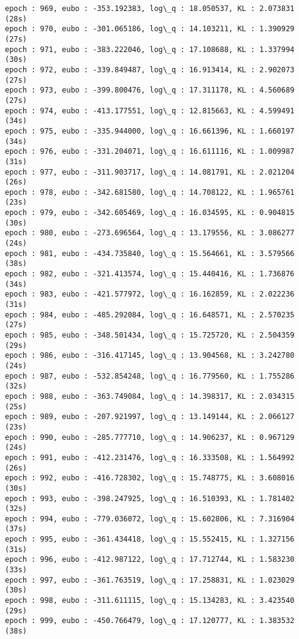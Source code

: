 \documentclass[11pt]{article}
\begin{document}
\begin{Verbatim}[commandchars=\\\{\}]
epoch : 969, eubo : -353.192383, log\_q : 18.050537, KL : 2.073831 (28s)
epoch : 970, eubo : -301.065186, log\_q : 14.103211, KL : 1.390929 (27s)
epoch : 971, eubo : -383.222046, log\_q : 17.108688, KL : 1.337994 (30s)
epoch : 972, eubo : -339.849487, log\_q : 16.913414, KL : 2.902073 (27s)
epoch : 973, eubo : -399.800476, log\_q : 17.311178, KL : 4.560689 (27s)
epoch : 974, eubo : -413.177551, log\_q : 12.815663, KL : 4.599491 (34s)
epoch : 975, eubo : -335.944000, log\_q : 16.661396, KL : 1.660197 (34s)
epoch : 976, eubo : -331.204071, log\_q : 16.611116, KL : 1.009987 (31s)
epoch : 977, eubo : -311.903717, log\_q : 14.081791, KL : 2.021204 (26s)
epoch : 978, eubo : -342.681580, log\_q : 14.708122, KL : 1.965761 (23s)
epoch : 979, eubo : -342.605469, log\_q : 16.034595, KL : 0.904815 (30s)
epoch : 980, eubo : -273.696564, log\_q : 13.179556, KL : 3.086277 (24s)
epoch : 981, eubo : -434.735840, log\_q : 15.564661, KL : 3.579566 (38s)
epoch : 982, eubo : -321.413574, log\_q : 15.440416, KL : 1.736876 (34s)
epoch : 983, eubo : -421.577972, log\_q : 16.162859, KL : 2.022236 (31s)
epoch : 984, eubo : -485.292084, log\_q : 16.648571, KL : 2.570235 (27s)
epoch : 985, eubo : -348.501434, log\_q : 15.725720, KL : 2.504359 (29s)
epoch : 986, eubo : -316.417145, log\_q : 13.904568, KL : 3.242780 (24s)
epoch : 987, eubo : -532.854248, log\_q : 16.779560, KL : 1.755286 (32s)
epoch : 988, eubo : -363.749084, log\_q : 14.398317, KL : 2.034315 (25s)
epoch : 989, eubo : -207.921997, log\_q : 13.149144, KL : 2.066127 (23s)
epoch : 990, eubo : -285.777710, log\_q : 14.906237, KL : 0.967129 (24s)
epoch : 991, eubo : -412.231476, log\_q : 16.333508, KL : 1.564992 (26s)
epoch : 992, eubo : -416.728302, log\_q : 15.748775, KL : 3.608016 (30s)
epoch : 993, eubo : -398.247925, log\_q : 16.510393, KL : 1.781402 (32s)
epoch : 994, eubo : -779.036072, log\_q : 15.602806, KL : 7.316904 (37s)
epoch : 995, eubo : -361.434418, log\_q : 15.552415, KL : 1.327156 (31s)
epoch : 996, eubo : -412.987122, log\_q : 17.712744, KL : 1.583230 (33s)
epoch : 997, eubo : -361.763519, log\_q : 17.258831, KL : 1.023029 (30s)
epoch : 998, eubo : -311.611115, log\_q : 15.134283, KL : 3.423540 (29s)
epoch : 999, eubo : -450.766479, log\_q : 17.120777, KL : 1.383532 (38s)

    \end{Verbatim}
\end{document}
